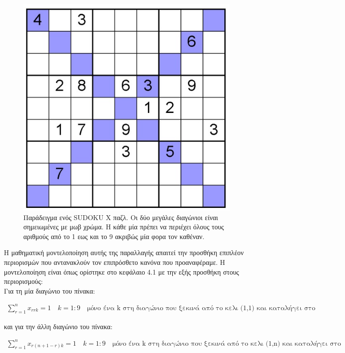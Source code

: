 \documentclass[12pt]{book}
\theoremstyle{definition}
\begin{document}
\begin{figure}[h]
	\centering
	\includegraphics[scale=1.5]{Figures/sudokuX.jpg}
	\caption{Παράδειγμα ενός SUDOKU X παζλ. Οι δύο μεγάλες διαγώνιοι είναι σημειωμένες με μωβ χρώμα. Η κάθε μία πρέπει να περιέχει όλους τους αριθμούς από το 1 εως και το 9 ακριβώς μία φορα τον καθέναν.}
\end{figure}

Η μαθηματική μοντελοποίηση αυτής της παραλλαγής απαιτεί την προσθήκη επιπλέον περιορισμών που αντανακλούν τον επιπρόσθετο κανόνα που προαναφέραμε. Η μοντελοποίηση είναι όπως ορίστηκε στο κεφάλαιο 4.1 με την εξής προσθήκη στους περιορισμούς: \\

Για τη μία διαγώνιο του πίνακα:

\begin{align*}
	\sum_{r=1}^{n} x_{rrk} = 1 \quad k=1:9 \quad \text{μόνο ένα k στη διαγώνιο που ξεκινά από το κελι (1,1) και καταλήγει στο κελι (n,n)}
\end{align*}

και για την άλλη διαγώνιο του πίνακα:

\begin{align*}
\sum_{r=1}^{n} x_{r(n+1-r)k} = 1 \quad k=1:9 \quad \text{μόνο ένα k στη διαγώνιο που ξεκινά από το κελι (1,n) και καταλήγει στο κελι (n,1)}
\end{align*}
\end{document}
